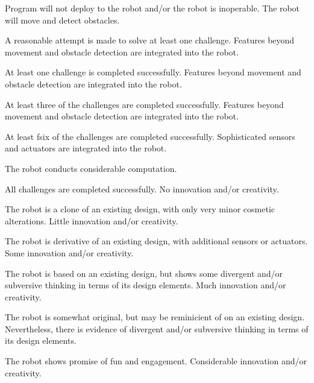 \documentclass{fal_assignment}
\begin{document}
\begin{markingrubric}
%
        \grade\fail 	Program will not deploy to the robot and/or the robot is inoperable.
        \grade 		The robot will move and detect obstacles.
         \par 		A reasonable attempt is made to solve at least one challenge.
        \grade 		Features beyond movement and obstacle detection are integrated into the robot.
            \par 		At least one challenge is completed successfully. 
        \grade 		Features beyond movement and obstacle detection are integrated into the robot.
            \par 		At least three of the challenges are completed successfully. 
        \grade 		Features beyond movement and obstacle detection are integrated into the robot.
            \par 		At least fsix of the challenges are completed successfully. 
        \grade 		Sophisticated sensors and actuators are integrated into the robot.
            \par 		The robot conducts considerable computation.
            \par 		All challenges are completed successfully. 
%
        \grade\fail No innovation and/or creativity.
            \par The robot is a clone of an existing design, with only very minor cosmetic alterations.
        \grade Little innovation and/or creativity.
            \par The robot is derivative of an existing design, with additional sensors or actuators.
        \grade Some innovation and/or creativity.
            \par The robot is based on an existing design, but shows some divergent and/or subversive thinking in terms of its design elements.
        \grade Much innovation and/or creativity.
            \par The robot is somewhat original, but may be reminicient of on an existing design. 
                    Nevertheless, there is evidence of divergent and/or subversive thinking in terms of its design elements.
            \par The robot shows promise of fun and engagement.
        \grade Considerable innovation and/or creativity.

\end{markingrubric}
\end{document}
